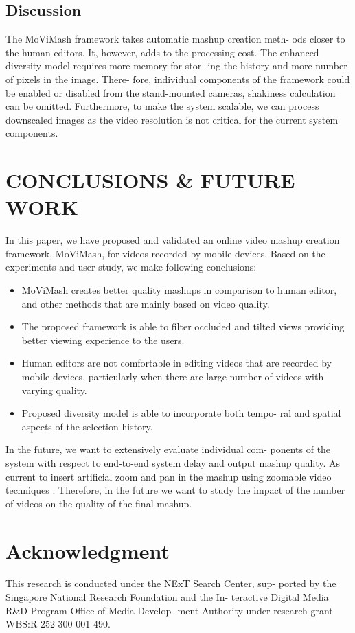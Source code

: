 \documentclass[conference]{IEEEtran}
\begin{document}
\subsection{Discussion}
The MoViMash framework takes automatic mashup creation meth-
ods closer to the human editors. It, however, adds to the processing
cost. The enhanced diversity model requires more memory for stor-
ing the history and more number of pixels in the image. There-
fore, individual components of the framework could be enabled or
disabled from the stand-mounted cameras,
shakiness calculation can be omitted. Furthermore, to make the
system scalable, we can process downscaled images as the video
resolution is not critical for the current system components.

\section{CONCLUSIONS \& FUTURE WORK}
In this paper, we have proposed and validated an online video
mashup creation framework, MoViMash, for videos recorded by
mobile devices. Based on the experiments and user study, we make
following conclusions:

\begin{itemize}
    \item MoViMash creates better quality mashups in comparison to
human editor, and other methods that are mainly based on
video quality.
    \item The proposed framework is able to filter occluded and tilted
views providing better viewing experience to the users.
    \item Human editors are not comfortable in editing videos that are
recorded by mobile devices, particularly when there are large
number of videos with varying quality.
    \item Proposed diversity model is able to incorporate both tempo-
ral and spatial aspects of the selection history.
\end{itemize}

In the future, we want to extensively evaluate individual com-
ponents of the system with respect to end-to-end system delay and
output mashup quality. As current to insert artificial zoom and pan in the
mashup using zoomable video techniques \cite{11}. Therefore, in the future we want
to study the impact of the number of videos on the quality of the
final mashup.

\section{Acknowledgment}
This research is conducted under the NExT Search Center, sup-
ported by the Singapore National Research Foundation and the In-
teractive Digital Media R\&D Program Office of Media Develop-
ment Authority under research grant WBS:R-252-300-001-490.



\end{document}
